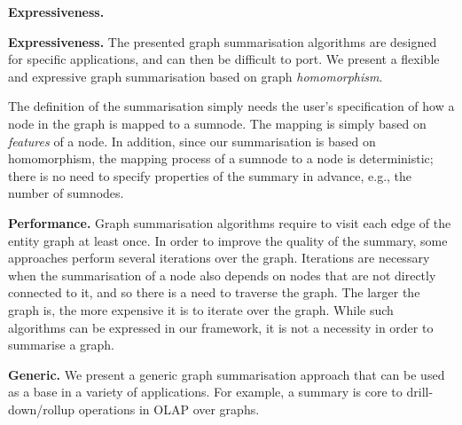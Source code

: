 \begin{labeling}{\textbf{Expressiveness.}}
	\item[\textbf{Expressiveness.}] The presented graph summarisation algorithms are designed for specific applications, and can then be difficult to port. We present a flexible and expressive graph summarisation based on graph \emph{homomorphism}.

	The definition of the summarisation simply needs the user's specification of how a node in the graph is mapped to a sumnode. The mapping is simply based on \emph{features} of a node. In addition, since our summarisation is based on homomorphism, the mapping process of a sumnode to a node is deterministic; there is no need to specify properties of the summary in advance, e.g., the number of sumnodes.
	\item[\textbf{Performance.}] Graph summarisation algorithms require to visit each edge of the entity graph at least once. In order to improve the quality of the summary, some approaches \cite{zheng:ipsj:2011} perform several iterations over the graph. Iterations are necessary when the summarisation of a node also depends on nodes that are not directly connected to it, and so there is a need to traverse the graph. The larger the graph is, the more expensive it is to iterate over the graph. While such algorithms can be expressed in our framework, it is not a necessity in order to summarise a graph.
	\item[\textbf{Generic.}] We present a generic graph summarisation approach that can be used as a base in a variety of applications. For example, a summary is core to drill-down/rollup operations in OLAP over graphs.
\end{labeling}

